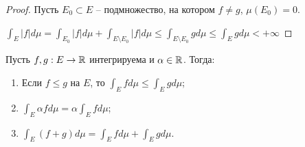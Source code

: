 \begin{proof}
    Пусть $E_{0} \subset E$ -- подмножество, на котором $f \neq g$, $\mu(E_{0}) = 0$. 
    
    $\int_{E}|f| d\mu = \int_{E_{0}}|f| d\mu + \int_{E \setminus E_{0}}|f| d\mu \leq \int_{E \setminus E_{0}}g d\mu \leq \int_{E}g d\mu < + \infty$  
\end{proof}

\begin{theorem}
    Пусть $f, g : E \to {\mathbb{R}}$ интегрируема и $\alpha \in {\mathbb{R}}$. Тогда:
    \begin{enumerate}
        \item Если $f \leq g$ на $E$, то $\int_{E}f d\mu \leq \int_{E}g d\mu$;
        \item $\int_{E}\alpha f d\mu = \alpha \int_{E}f d\mu$;
        \item $\int_{E}(f + g) d\mu = \int_{E}f d\mu + \int_{E}g d\mu$.
    \end{enumerate}
\end{theorem}

